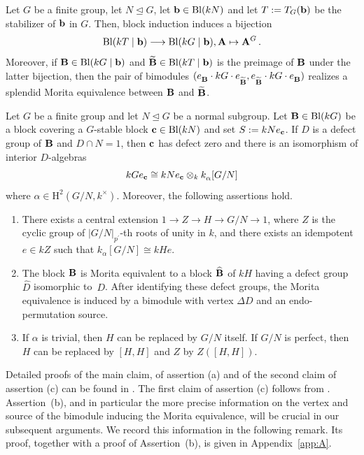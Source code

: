 \begin{thm}\label{thm:FongReynolds}%
Let $G$ be a finite group, let $N\unlhd G$, let ${\mathbf{b}}\in\operatorname{Bl}(kN)$
and  let $T:= T_G({\mathbf{b}})$ be the stabilizer of ${\mathbf{b}}$ in $G$. Then, block induction induces a bijection
$$\operatorname{Bl}(kT\mid{\mathbf{b}})\longrightarrow \operatorname{Bl}(kG\mid{\mathbf{b}}), {\mathbf{A}}\mapsto {\mathbf{A}}^G\,.$$
Moreover, if ${\mathbf{B}}\in\operatorname{Bl}(kG\mid{\mathbf{b}})$ and $\widetilde{{\mathbf{B}}}\in\operatorname{Bl}(kT\mid{\mathbf{b}})$ is the preimage of ${\mathbf{B}}$ under the latter bijection, then the pair of bimodules $(e^{}_{{\mathbf{B}}}\cdot kG\cdot e^{}_{\widetilde{{\mathbf{B}}}}, e^{}_{\widetilde{{\mathbf{B}}}}\cdot kG\cdot e^{}_{{\mathbf{B}}})$ realizes a splendid Morita equivalence between ${\mathbf{B}}$ and $\widetilde{{\mathbf{B}}}$. 
\end{thm}

\begin{thm}\label{thm:Fong2ndReduction}%
   Let $G$ be a finite group and let $N\unlhd G$ be a normal subgroup. Let ${\mathbf{B}}\in\operatorname{Bl}(kG)$ be a block  covering a $G$-stable block ${\mathbf{c}}\in\operatorname{Bl}(kN)$ and set $S:=kNe_{{\mathbf{c}}}$. 
   If $D$ is a defect group of ${\mathbf{B}}$ and $D\cap N=1$, then ${\mathbf{c}}$ has defect zero and there is an isomorphism of interior $D$-algebras
   \[
   kGe_{{\mathbf{c}}}\cong kNe_{{\mathbf{c}}}\otimes_k k^{}_{\alpha}[G/N]
   \]
   where $\alpha\in {\mathrm{H}}^2(G/N,k^{\times})$.  Moreover, the following assertions hold.
   \begin{enumerate}[label={\rm(\alph*)}]
       \item  
       There exists a central extension 
       {$1\longrightarrow Z\longrightarrow H\longrightarrow G/N\longrightarrow 1$}, where $Z$ is the cyclic group of $|G/N|_{p^\prime}$-th roots of unity in $k$, and there exists an idempotent $e\in kZ$ such that $k^{}_{\alpha}[G/N]\cong kHe$.
       \item The block ${\mathbf{B}}$ is Morita equivalent to a block $\widehat{{\mathbf{B}}}$ of $kH$ having a defect group $\widehat D$ isomorphic to~$D$. After identifying these defect groups, the Morita equivalence is induced by a bimodule with vertex $\Delta D$ and an endo-permutation source.
       \item  If $\alpha$ is trivial, then $H$ can be replaced by $G/N$ itself. 
       If $G/N$ is perfect, then $H$ can be replaced by $[H,H]$ and $Z$ by $Z([H,H])$. 
   \end{enumerate}   
\end{thm}

\noindent Detailed proofs of the main claim, of assertion (a) and of the second claim of assertion  (c)  can be found in \cite[\S3 and \S4]{SalminenSOURCES08}.
    The first claim of assertion (c) follows from \cite[Proposition 1.2.6]{LinckelmannVol1}.
   Assertion~{\rm(b)}, and in particular the more precise information on the vertex and source of the bimodule inducing the Morita equivalence, will be crucial in our subsequent arguments. We record this information in the
following remark. Its proof, together with a proof of Assertion~{\rm(b)}, is given in
Appendix~\ref{app:A}.

